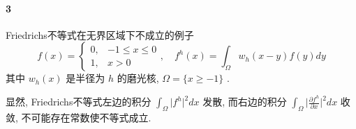 \documentclass[a4paper, UTF8]{ctexart}				%
\numberwithin{equation}{section}				%
\begin{document}
    \paragraph{3} Friedrichs不等式在无界区域下不成立的例子 
    \[
        f(x) = 
        \begin{cases}
            0, & -1 \le x \le 0\\
            1, & x > 0
        \end{cases} ,
        \quad
        f^h(x) = \int^{}_{\Omega} w_h(x - y) f(y) dy
    \]
    其中 $w_h(x)$ 是半径为 $h$ 的磨光核, $\Omega = \{x \ge -1\}$ .

    显然, Friedrichs不等式左边的积分 $\int^{}_{\Omega} \vert{f^h}\vert^2 dx$ 发散, 而右边的积分 $\int^{}_{\Omega}\vert{\frac{\partial f^h}{\partial x}}\vert^2 dx$ 收敛, 不可能存在常数使不等式成立.
\end{document}
